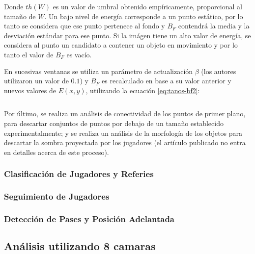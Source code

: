 \documentclass[a4paper,10pt]{article}
\begin{document}
\begin{equation}
  \label{eq:tanos-bf1}
\end{equation}

Donde $th(W)$ es un valor de umbral obtenido empíricamente, proporcional al
tamaño de $W$. Un bajo nivel de energía corresponde a un punto estático,
por lo tanto se considera que ese punto pertenece al fondo y $B_F$
contendrá la media y la desviación estándar para ese punto. Si la imágen
tiene un alto valor de energía, se considera al punto un candidato a
contener un objeto en movimiento y por lo tanto el valor de $B_F$ es
vacío. %

En sucesivas ventanas se utiliza un parámetro de actualización $\beta$ (los
autores utilizaron un valor de $0.1$) y $B_F$ es recalculado en base a su valor
anterior y nuevos valores de $E(x, y)$, utilizando la ecuación
\ref{eq:tanos-bf2}:

\begin{equation} \label{eq:tanos-bf2}
\end{equation}

Por último, se realiza un análisis de conectividad de los puntos de primer
plano, para descartar conjuntos de puntos por debajo de un tamaño establecido
experimentalmente; y se realiza un análisis de la morfología de los objetos
para descartar la sombra proyectada por los jugadores (el artículo publicado
no entra en detalles acerca de este proceso).

\subsubsection{Clasificación de Jugadores y Referies}



\subsubsection{Seguimiento de Jugadores}

\subsubsection{Detección de Pases y Posición Adelantada}







\subsection{Análisis utilizando 8 camaras}
\label{sec:8-camaras}
\end{document}
